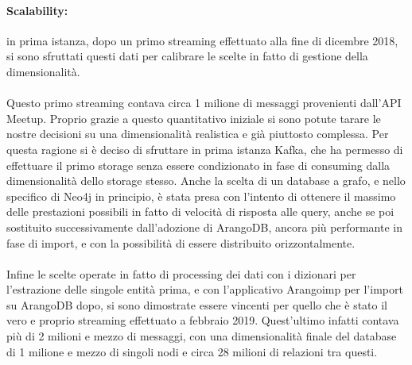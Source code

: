 \documentclass[fleqn,10pt]{SelfArx} %
\begin{document}
{{\paragraph{Scalability:} in prima istanza, dopo un primo streaming effettuato alla fine di dicembre 2018, si sono sfruttati questi dati per calibrare le scelte in fatto di gestione della dimensionalità. \\
\\ Questo primo streaming contava circa 1 milione di messaggi provenienti dall'API Meetup. 
Proprio grazie a questo quantitativo iniziale si sono potute tarare le nostre decisioni su una dimensionalità realistica e già piuttosto complessa. 
Per questa ragione si è deciso di sfruttare in prima istanza Kafka, che ha permesso di effettuare il primo storage senza essere condizionato in fase di consuming dalla dimensionalità dello storage stesso. 
Anche la scelta di un database a grafo, e nello specifico di Neo4j in principio, è stata presa con l'intento di ottenere il massimo delle prestazioni possibili in fatto di velocità di risposta alle query, anche se poi sostituito successivamente dall'adozione di ArangoDB, ancora più performante in fase di import, e con la possibilità di essere distribuito orizzontalmente. \\
\\Infine le scelte operate in fatto di processing dei dati con i dizionari per l'estrazione delle singole entità prima, e con l'applicativo Arangoimp per l'import su ArangoDB dopo, si sono dimostrate essere vincenti per quello che è stato il vero e proprio streaming effettuato a febbraio 2019.
Quest'ultimo infatti contava più di 2 milioni e mezzo di messaggi, con una dimensionalità finale del database di 1 milione e mezzo di singoli nodi e circa 28 milioni di relazioni tra questi.
}}
\end{document}
